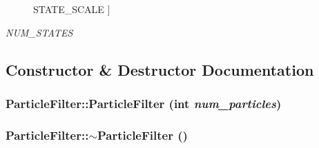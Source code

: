 \begin{Desc}
\begin{description}
{\hypertarget{classParticleFilter_a5fd916dcc074edfb45cf0f90e6e7816aac85f631868fa888a31c4b1048f26c9b9}{
STATE\_\-SCALE}
\label{classParticleFilter_a5fd916dcc074edfb45cf0f90e6e7816aac85f631868fa888a31c4b1048f26c9b9}
}]\item[{\em 
\hypertarget{classParticleFilter_a5fd916dcc074edfb45cf0f90e6e7816aa6be500dda12c848a8fa746cecf967e59}{
NUM\_\-STATES}
\label{classParticleFilter_a5fd916dcc074edfb45cf0f90e6e7816aa6be500dda12c848a8fa746cecf967e59}
}]\end{description}
\end{Desc}



\subsection{Constructor \& Destructor Documentation}
\hypertarget{classParticleFilter_a76dd2772cb2d4a3eece16415691bc39c}{
\subsubsection[{ParticleFilter}]{\setlength{\rightskip}{0pt plus 5cm}ParticleFilter::ParticleFilter (int {\em num\_\-particles})}}
\label{classParticleFilter_a76dd2772cb2d4a3eece16415691bc39c}
\hypertarget{classParticleFilter_a4f4ccdfa224f0a62c411230f7fb0cd65}{
\subsubsection[{$\sim$ParticleFilter}]{\setlength{\rightskip}{0pt plus 5cm}ParticleFilter::$\sim$ParticleFilter ()}}
\label{classParticleFilter_a4f4ccdfa224f0a62c411230f7fb0cd65}


